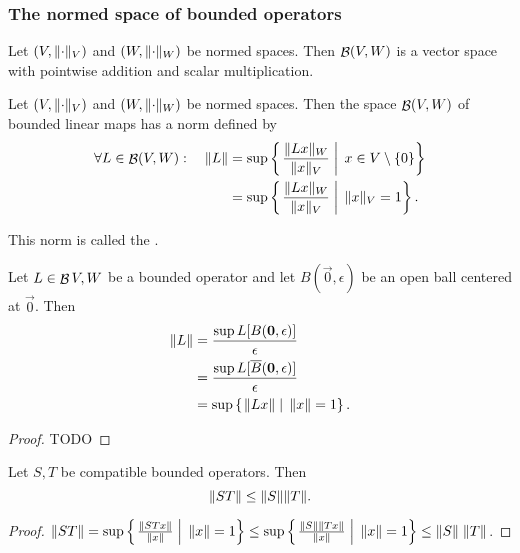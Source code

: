 \subsubsection{The normed space of bounded operators}
\begin{proposition}
Let $(V,\lVert\cdot\rVert_V)$ and $(W,\lVert\cdot\rVert_W)$ be normed spaces. Then $\mathop{\mathcal{B}}(V,W)$ is a vector space with pointwise addition and scalar multiplication.
\end{proposition}

\begin{proposition}
Let $(V,\lVert\cdot\rVert_V)$ and $(W,\lVert\cdot\rVert_W)$ be normed spaces. Then the space $\mathop{\mathcal{B}}(V,W)$ of bounded linear maps has a norm defined by
\begin{align*}
\forall L\in \mathop{\mathcal{B}}(V,W): \quad \lVert L\rVert &= \sup\left\{\left. \frac{\lVert Lx\rVert_W}{\lVert x\rVert_V} \;\right|\; x\in V\setminus\{0\} \right\} \\
&= \sup\left\{\left. \frac{\lVert Lx\rVert_W}{\lVert x\rVert_V} \;\right|\; \lVert x\rVert_V=1 \right\}.
\end{align*}
\end{proposition}

\begin{definition}
    This norm is called the .
\end{definition}

\begin{proposition} \label{prop:operatorNorm}
Let $L\in\mathop{\mathcal{B}}{V,W}$ be a bounded operator and let $B(\vec{0},\epsilon)$ be an open ball centered at $\vec{0}$. Then
\begin{align*}
\lVert L\rVert &= \frac{\sup L[B(\bm{\mathrm{0}},\epsilon)]}{\epsilon} \\
&= \frac{\sup L[\overline{B}(\bm{\mathrm{0}},\epsilon)]}{\epsilon} \\
&= \sup\left\{\left. \lVert Lx\rVert \;\right|\; \lVert x\rVert = 1 \right\}.
\end{align*}
\end{proposition}
\begin{proof}
TODO
\end{proof}

\begin{lemma}
Let $S,T$ be compatible bounded operators. Then
\[ \lVert ST\rVert \leq \lVert S\rVert\lVert T\rVert. \]
\end{lemma}
\begin{proof}
$\lVert ST\rVert = \sup\left\{\left. \frac{\lVert STx\rVert}{\lVert x\rVert} \;\right|\; \lVert x\rVert=1 \right\} \leq \sup\left\{\left. \frac{\lVert S\rVert\lVert Tx\rVert}{\lVert x\rVert} \;\right|\; \lVert x\rVert=1 \right\}\leq \lVert S\rVert\;\lVert T\rVert$.
\end{proof}

